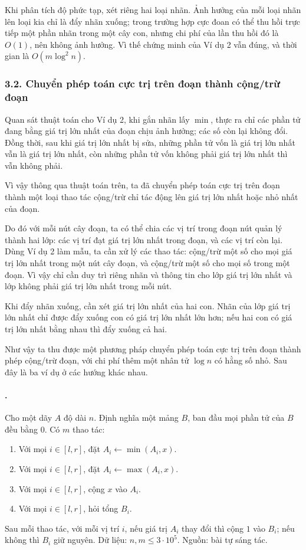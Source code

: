\documentclass[11pt]{article}
\begin{document}
Khi phân tích độ phức tạp, xét riêng hai loại nhãn. Ảnh hưởng của mỗi loại
nhãn lên loại kia chỉ là đẩy nhãn xuống; trong trường hợp cực đoan có thể thu
hồi trực tiếp một phần nhãn trong một cây con, nhưng chi phí của lần thu hồi
đó là \(O(1)\), nên không ảnh hưởng. Vì thế chứng minh của Ví dụ 2 vẫn đúng,
và thời gian là \(O(m\log^2 n)\).

\subsubsection*{3.2. Chuyển phép toán cực trị trên đoạn thành cộng/trừ đoạn}

Quan sát thuật toán cho Ví dụ 2, khi gắn nhãn lấy \(\min\), thực ra chỉ các
phần tử đang bằng giá trị lớn nhất của đoạn chịu ảnh hưởng; các số còn lại
không đổi. Đồng thời, sau khi giá trị lớn nhất bị sửa, những phần tử vốn là
giá trị lớn nhất vẫn là giá trị lớn nhất, còn những phần tử vốn không phải
giá trị lớn nhất thì vẫn không phải.

Vì vậy thông qua thuật toán trên, ta đã chuyển phép toán cực trị trên đoạn
thành một loại thao tác cộng/trừ chỉ tác động lên giá trị lớn nhất hoặc nhỏ
nhất của đoạn.

Do đó với mỗi nút cây đoạn, ta có thể chia các vị trí trong đoạn nút quản lý
thành hai lớp: các vị trí đạt giá trị lớn nhất trong đoạn, và các vị trí còn
lại. Dùng Ví dụ 2 làm mẫu, ta cần xử lý các thao tác: cộng/trừ một số cho mọi
giá trị lớn nhất trong một nút cây đoạn, và cộng/trừ một số cho mọi số trong
một đoạn. Vì vậy chỉ cần duy trì riêng nhãn và thông tin cho lớp giá trị lớn
nhất và lớp không phải giá trị lớn nhất trong mỗi nút.

Khi đẩy nhãn xuống, cần xét giá trị lớn nhất của hai con. Nhãn của lớp giá
trị lớn nhất chỉ được đẩy xuống con có giá trị lớn nhất lớn hơn; nếu hai con
có giá trị lớn nhất bằng nhau thì đẩy xuống cả hai.

Như vậy ta thu được một phương pháp chuyển phép toán cực trị trên đoạn thành
phép cộng/trừ đoạn, với chi phí thêm một nhân tử \(\log n\) có hằng số nhỏ.
Sau đây là ba ví dụ ở các hướng khác nhau.

\paragraph{.}
Cho một dãy \(A\) độ dài \(n\). Định nghĩa một mảng \(B\), ban đầu mọi phần
tử của \(B\) đều bằng \(0\). Có \(m\) thao tác:
\begin{enumerate}
  \item Với mọi \(i\in[l,r]\), đặt \(A_i\leftarrow \min(A_i,x)\).
  \item Với mọi \(i\in[l,r]\), đặt \(A_i\leftarrow \max(A_i,x)\).
  \item Với mọi \(i\in[l,r]\), cộng \(x\) vào \(A_i\).
  \item Với mọi \(i\in[l,r]\), hỏi tổng \(B_i\).
\end{enumerate}
Sau mỗi thao tác, với mỗi vị trí \(i\), nếu giá trị \(A_i\) thay đổi thì cộng
\(1\) vào \(B_i\); nếu không thì \(B_i\) giữ nguyên. Dữ liệu:
\(n,m\le 3\cdot 10^5\). Nguồn: bài tự sáng tác.
\end{document}
